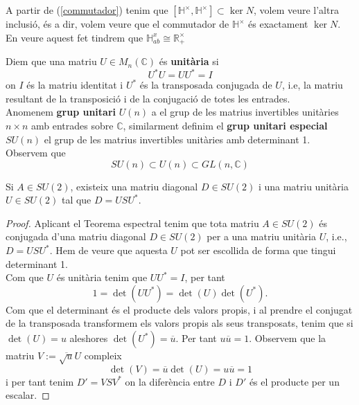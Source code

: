 A partir de (\ref{commutador}) tenim que $[\mathbb{H}^\times,\mathbb{H}^\times]\subset \ker N$, volem veure l'altra inclusió, és a dir, volem veure que el commutador de $\mathbb{H}^\times$ és exactament $\ker N$. En veure aquest fet tindrem que $\mathbb{H}_{ab}^x\cong \mathbb{R}^\times_+$
\begin{definition}
Diem que una matriu $U \in M_n(\mathbb{C})$ és \textbf{unitària} si $$U^*U = UU^*=I$$
on $I$ és la matriu identitat i $U^*$ és la transposada conjugada de $U$, i.e, la matriu resultant de la transposició i de la conjugació de totes les entrades.\\ 
\indent Anomenem \textbf{grup unitari} $U(n)$ a el grup de les matrius invertibles unitàries $n\times n$ amb entrades sobre $\mathbb{C}$, similarment definim el \textbf{grup unitari especial} $SU(n)$ el grup de les matrius invertibles unitàries amb determinant 1.  \\
Observem que $$SU(n)\subset U(n)\subset GL(n,\mathbb{C})$$
\end{definition}

\begin{lemma}\label{asdf1}
Si $A\in SU(2)$, existeix una matriu diagonal $D\in SU(2)$ i una matriu unitària $U\in SU(2)$ tal que $D=USU^*$.
\end{lemma}
\begin{proof}
Aplicant el Teorema espectral tenim que tota matriu $A\in SU(2)$ és conjugada d'una matriu diagonal $D\in SU(2)$ per a una matriu unitària $U$, i.e., $D=USU^*$. Hem de veure que aquesta $U$ pot ser escollida de forma que tingui determinant 1. \\
Com que $U$ és unitària tenim que $UU^*=I$, per tant $$1=\det(UU^*)=\det(U)\det(U^*).$$
Com que el determinant és el producte dels valors propis, i al prendre el conjugat de la transposada transformem els valors propis als seus transposats, tenim que si $\det(U) = u$ aleshores $\det(U^*)=\overline{u}$. Per tant $u\overline{u}=1$. 
Observem que la matriu $V:=\overbar{\sqrt{u}} U$ compleix
$$
\det(V)=\overline{u} \det (U) = u\overline{u} = 1
$$ 
i per tant tenim $D'=VSV^*$ on la diferència entre $D$ i $D'$ és el producte per un escalar.
\end{proof}

